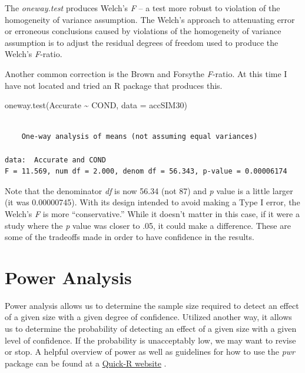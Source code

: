 \documentclass[
  11pt,
]{book}
\newenvironment{Shaded}{\begin{snugshade}}{\end{snugshade}}
\newcommand{\AttributeTok}[1]{\textcolor[rgb]{0.77,0.63,0.00}{#1}}
\newcommand{\FunctionTok}[1]{\textcolor[rgb]{0.00,0.00,0.00}{#1}}
\newcommand{\NormalTok}[1]{#1}
\newcommand{\SpecialCharTok}[1]{\textcolor[rgb]{0.00,0.00,0.00}{#1}}
\begin{document}
The \emph{oneway.test} produces Welch's \emph{F} -- a test more robust to violation of the homogeneity of variance assumption. The Welch's approach to attenuating error or erroneous conclusions caused by violations of the homogeneity of variance assumption is to adjust the residual degrees of freedom used to produce the Welch's \emph{F}-ratio.

Another common correction is the Brown and Forsythe \emph{F}-ratio. At this time I have not located and tried an R package that produces this.

\begin{Shaded}
\begin{Highlighting}[]
\FunctionTok{oneway.test}\NormalTok{(Accurate }\SpecialCharTok{\textasciitilde{}}\NormalTok{ COND, }\AttributeTok{data =}\NormalTok{ accSIM30)}
\end{Highlighting}
\end{Shaded}

\begin{verbatim}

    One-way analysis of means (not assuming equal variances)

data:  Accurate and COND
F = 11.569, num df = 2.000, denom df = 56.343, p-value = 0.00006174
\end{verbatim}

Note that the denominator \emph{df} is now 56.34 (not 87) and \emph{p} value is a little larger (it was 0.00000745). With its design intended to avoid making a Type I error, the Welch's \emph{F} is more ``conservative.'' While it doesn't matter in this case, if it were a study where the \emph{p} value was closer to .05, it could make a difference. These are some of the tradeoffs made in order to have confidence in the results.

\hypertarget{power-analysis}{%
\section{Power Analysis}\label{power-analysis}}

Power analysis allows us to determine the sample size required to detect an effect of a given size with a given degree of confidence. Utilized another way, it allows us to determine the probability of detecting an effect of a given size with a given level of confidence. If the probability is unacceptably low, we may want to revise or stop. A helpful overview of power as well as guidelines for how to use the \emph{pwr} package can be found at a \href{https://www.statmethods.net/stats/power.html}{Quick-R website} \citep{kabacoff_power_2017}.
\end{document}
